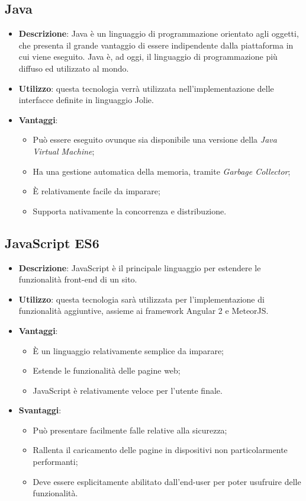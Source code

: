\subsection{Java}
\begin{itemize}
	\item \textbf{Descrizione}: Java è un linguaggio di programmazione orientato agli oggetti, che presenta il grande vantaggio di essere indipendente dalla piattaforma in cui viene eseguito. Java è, ad oggi, il linguaggio di programmazione più diffuso ed utilizzato al mondo.
	\item \textbf{Utilizzo}: questa tecnologia verrà utilizzata nell'implementazione delle interfacce definite in linguaggio Jolie.
	\item \textbf{Vantaggi}:
	\begin{itemize}
		\item Può essere eseguito ovunque sia disponibile una versione della \textit{Java Virtual Machine};
		\item Ha una gestione automatica della memoria, tramite \textit{Garbage Collector};
		\item \MakeUppercase{è} relativamente facile da imparare;
		\item Supporta nativamente la concorrenza e distribuzione.
	\end{itemize}
\end{itemize}

\subsection{JavaScript ES6}
\begin{itemize}
	\item \textbf{Descrizione}: JavaScript è il principale linguaggio per estendere le funzionalità front-end di un sito.
	\item \textbf{Utilizzo}: questa tecnologia sarà utilizzata per l'implementazione di funzionalità aggiuntive, assieme ai framework Angular 2 e MeteorJS.
	\item \textbf{Vantaggi}:
	\begin{itemize}
		\item \MakeUppercase{è} un linguaggio relativamente semplice da imparare;
		\item Estende le funzionalità delle pagine web;
		\item JavaScript è relativamente veloce per l'utente finale.
	\end{itemize}
	\item \textbf{Svantaggi}:
	\begin{itemize}
		\item Può presentare facilmente falle relative alla sicurezza;
		\item Rallenta il caricamento delle pagine in dispositivi non particolarmente performanti;
		\item Deve essere esplicitamente abilitato dall'end-user per poter usufruire delle funzionalità.
	\end{itemize}
\end{itemize}

